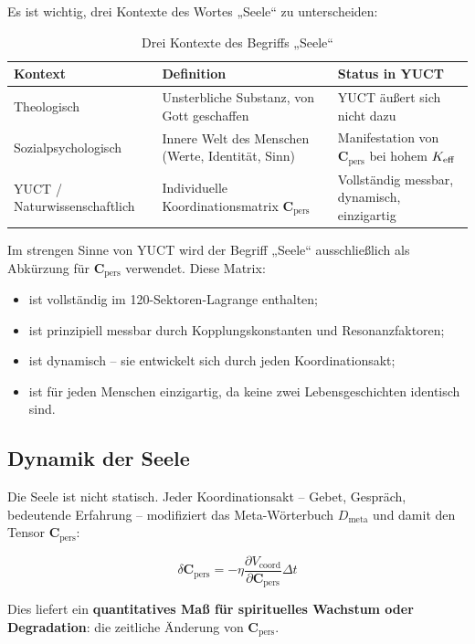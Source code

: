\documentclass[12pt,a4paper]{article}
\newcommand{\Cpers}{\mathbf{C}_{\text{pers}}}
\begin{document}
	Es ist wichtig, drei Kontexte des Wortes „Seele“ zu unterscheiden:
	
	\begin{table}[H]
		\centering
		\caption{Drei Kontexte des Begriffs „Seele“}
		\label{tab:soul-contexts}
		\begin{tabular}{p{3.5cm}p{5cm}p{5cm}}
			\toprule
			\textbf{Kontext} & \textbf{Definition} & \textbf{Status in YUCT} \\
			\midrule
			Theologisch & Unsterbliche Substanz, von Gott geschaffen & YUCT äußert sich nicht dazu \\
			Sozialpsychologisch & Innere Welt des Menschen (Werte, Identität, Sinn) & Manifestation von \(\Cpers\) bei hohem \(\Keff\) \\
			YUCT / Naturwissenschaftlich & Individuelle Koordinationsmatrix \(\Cpers\) & Vollständig messbar, dynamisch, einzigartig \\
			\bottomrule
		\end{tabular}
	\end{table}
	
	Im strengen Sinne von YUCT wird der Begriff „Seele“ ausschließlich als Abkürzung für \(\Cpers\) verwendet. Diese Matrix:
	\begin{itemize}
		\item ist vollständig im 120-Sektoren-Lagrange enthalten;
		\item ist prinzipiell messbar durch Kopplungskonstanten und Resonanzfaktoren;
		\item ist dynamisch – sie entwickelt sich durch jeden Koordinationsakt;
		\item ist für jeden Menschen einzigartig, da keine zwei Lebensgeschichten identisch sind.
	\end{itemize}
	
	\subsection{Dynamik der Seele}
	
	Die Seele ist nicht statisch. Jeder Koordinationsakt – Gebet, Gespräch, bedeutende Erfahrung – modifiziert das Meta-Wörterbuch \(D_{\text{meta}}\) und damit den Tensor \(\Cpers\):
	
	\begin{equation}
		\delta \Cpers = -\eta \frac{\partial V_{\text{coord}}}{\partial \Cpers} \Delta t
	\end{equation}
	
	Dies liefert ein \textbf{quantitatives Maß für spirituelles Wachstum oder Degradation}: die zeitliche Änderung von \(\Cpers\).
	
\end{document}
